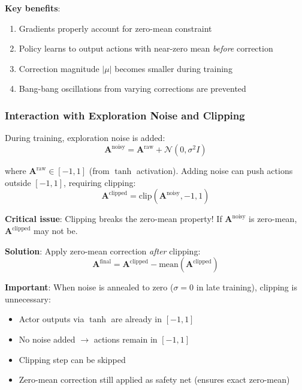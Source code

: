 \documentclass[11pt,a4paper]{article}
\theoremstyle{definition}
\begin{document}
\textbf{Key benefits}:
\begin{enumerate}
    \item Gradients properly account for zero-mean constraint
    \item Policy learns to output actions with near-zero mean \emph{before} correction
    \item Correction magnitude $|\mu|$ becomes smaller during training
    \item Bang-bang oscillations from varying corrections are prevented
\end{enumerate}

\subsubsection{Interaction with Exploration Noise and Clipping}

During training, exploration noise is added:
\begin{equation}
\mathbf{A}^{\text{noisy}} = \mathbf{A}^{\text{raw}} + \mathcal{N}(0, \sigma^2 I)
\end{equation}

where $\mathbf{A}^{\text{raw}} \in [-1, 1]$ (from $\tanh$ activation). Adding noise can push actions outside $[-1, 1]$, requiring clipping:
\begin{equation}
\mathbf{A}^{\text{clipped}} = \text{clip}(\mathbf{A}^{\text{noisy}}, -1, 1)
\end{equation}

\textbf{Critical issue}: Clipping breaks the zero-mean property! If $\mathbf{A}^{\text{noisy}}$ is zero-mean, $\mathbf{A}^{\text{clipped}}$ may not be.

\textbf{Solution}: Apply zero-mean correction \emph{after} clipping:
\begin{equation}
\mathbf{A}^{\text{final}} = \mathbf{A}^{\text{clipped}} - \text{mean}(\mathbf{A}^{\text{clipped}})
\end{equation}

\textbf{Important}: When noise is annealed to zero ($\sigma = 0$ in late training), clipping is unnecessary:
\begin{itemize}
    \item Actor outputs via $\tanh$ are already in $[-1, 1]$
    \item No noise added $\to$ actions remain in $[-1, 1]$
    \item Clipping step can be skipped
    \item Zero-mean correction still applied as safety net (ensures exact zero-mean)
\end{itemize}
\end{document}

